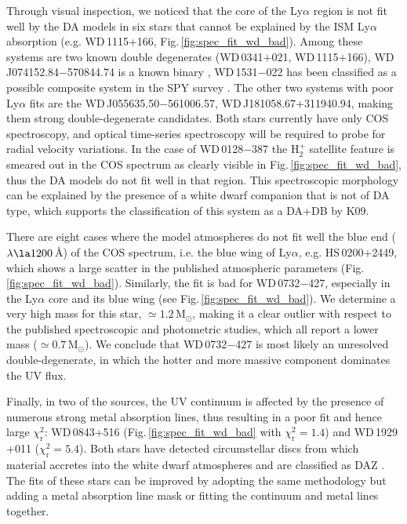 \documentclass[fleqn,usenatbib, useAMS]{mnras}
\newcommand{\Msun}{\mbox{$\mathrm{M_\odot}$}}
\begin{document}
Through visual inspection, we noticed that the core of the Ly$\alpha$ region is not fit well by the DA models in six stars that cannot be explained by the ISM Ly$\alpha$ absorption (e.g. WD\,1115+166, Fig.\,\ref{fig:spec_fit_wd_bad}).  Among these systems are two known double degenerates (WD\,0341$+$021, WD\,1115$+$166), WD\,J074152.84$-$570844.74 is a known binary \citep{mccook1999},  WD\,1531$-$022 has been classified as a possible composite system in the SPY survey \citep{Napiwotzki2020}. The other two systems with poor Ly$\alpha$ fits are the WD\,J055635.50$-$561006.57, WD\,J181058.67+311940.94, making them strong double-degenerate candidates. Both stars currently have only COS spectroscopy, and optical time-series spectroscopy will be required to probe for radial velocity variations. In the case of WD\,0128$-$387 the H$^{+}_{2}$ satellite feature is smeared out in the COS spectrum as clearly visible in Fig.\,\ref{fig:spec_fit_wd_bad}, thus the DA models do not fit well in that region. This spectroscopic morphology can be explained by the presence of a white dwarf companion that is not of DA type, which supports the classification of this system as a DA+DB by K09. 

There are eight cases where the model atmospheres do not fit well the blue end ($\lambda\la1200$\,\AA) of the COS spectrum, i.e. the blue wing of Ly$\alpha$, e.g. HS\,0200$+$2449, which shows a large scatter in the published atmospheric parameters (Fig.\,\ref{fig:spec_fit_wd_bad}). Similarly, the fit is bad for WD\,0732$-$427, especially in the Ly$\alpha$ core and its blue wing (see Fig.\,\ref{fig:spec_fit_wd_bad}). We determine a very high mass for this star, $\simeq1.2$\,\Msun, making it a clear outlier with respect to the published spectroscopic and photometric studies, which all report a lower mass ($\simeq0.7\,\Msun$). We conclude that WD\,0732$-$427 is most likely an unresolved double-degenerate, in which the hotter and more massive component dominates the UV flux.

Finally, in two of the sources, the UV continuum is affected by the presence of numerous strong metal absorption lines, thus resulting in a poor fit and hence large $\chi^{2}_\mathrm{r}$: WD\,0843+516 (Fig.\,\ref{fig:spec_fit_wd_bad} with $\chi^{2}_\mathrm{r}=1.4$) and WD\,1929$+$011 ($\chi^{2}_\mathrm{r}=5.4$). Both stars have detected circumstellar discs from which material accretes into the white dwarf atmospheres and are classified as DAZ \citep{boris2012}. The fits of these stars can be improved by adopting the same methodology but adding a metal absorption line mask or fitting the continuum and metal lines together.
\end{document}
